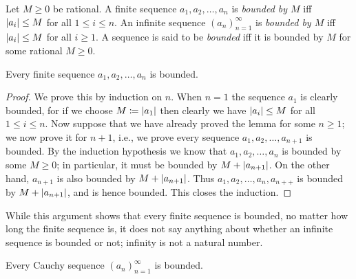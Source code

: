 \begin{definition}\label{5.1.12}
    Let \(M \geq 0\) be rational.
    A finite sequence \(a_1, a_2, \dots, a_n\) is \emph{bounded by \(M\)} iff \(\left\lvert a_i\right\rvert \leq M\) for all \(1 \leq i \leq n\).
    An infinite sequence \((a_n)_{n = 1}^{\infty}\) is \emph{bounded by \(M\)} iff \(\left\lvert a_i\right\rvert \leq M\) for all \(i \geq 1\).
    A sequence is said to be \emph{bounded} iff it is bounded by \(M\) for some rational \(M \geq 0\).
\end{definition}

\setcounter{theorem}{13}
\begin{lemma}\label{5.1.14}
    Every finite sequence \(a_1, a_2, \dots, a_n\) is bounded.
\end{lemma}

\begin{proof}
    We prove this by induction on \(n\).
    When \(n = 1\) the sequence \(a_1\) is clearly bounded, for if we choose \(M \coloneqq \left\lvert a_1\right\rvert\) then clearly we have \(\left\lvert a_i\right\rvert \leq M\) for all \(1 \leq i \leq n\).
    Now suppose that we have already proved the lemma for some \(n \geq 1\);
    we now prove it for \(n + 1\), i.e., we prove every sequence \(a_1, a_2, \dots, a_{n + 1}\) is bounded.
    By the induction hypothesis we know that \(a_1, a_2, \dots, a_n\) is bounded by some \(M \geq 0\);
    in particular, it must be bounded by \(M + \left\lvert a_{n + 1}\right\rvert\).
    On the other hand, \(a_{n + 1}\) is also bounded by \(M + \left\lvert a_{n + 1}\right\rvert\).
    Thus \(a_1, a_2, \dots, a_n, a_{n++}\) is bounded by \(M + \left\lvert a_{n + 1}\right\rvert\), and is hence bounded.
    This closes the induction.
\end{proof}

\begin{note}
    While this argument shows that every finite sequence is bounded, no matter how long the finite sequence is, it does not say anything about whether an infinite sequence is bounded or not;
    infinity is not a natural number.
\end{note}

\begin{lemma}\label{5.1.15}
    Every Cauchy sequence \((a_n)_{n = 1}^{\infty}\) is bounded.
\end{lemma}

